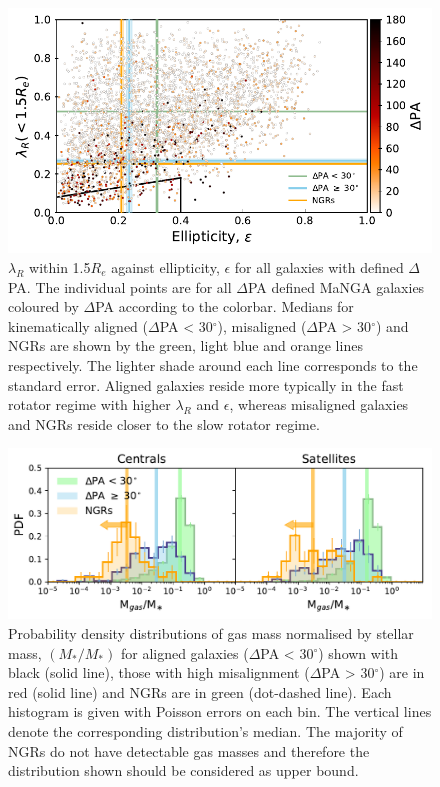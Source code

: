 \documentclass[fleqn,usenatbib]{mnras}
\begin{document}
\begin{figure}
	\includegraphics[width=\linewidth]{total_pop/delPA_lambda_Re.pdf}
    \caption{$\lambda_R$ within 1.5$R_e$ against ellipticity, $\epsilon$ for all galaxies with defined $\Delta$PA. The individual points are for all $\Delta$PA defined MaNGA galaxies coloured by $\Delta$PA according to the colorbar. Medians for kinematically aligned ($\Delta$PA < 30$^{\circ}$), misaligned ($\Delta$PA > 30$^{\circ}$) and NGRs are shown by the green, light blue and orange lines respectively. The lighter shade around each line corresponds to the standard error. Aligned galaxies reside more typically in the fast rotator regime with higher $\lambda_R$ and $\epsilon$, whereas misaligned galaxies and NGRs reside closer to the slow rotator regime.}
    \label{fig:delPA_lambda_Re}
\end{figure}

\begin{figure}
	\includegraphics[width=\linewidth]{total_pop/gas_mass_normed.pdf}
    \caption{Probability density distributions of gas mass normalised by stellar mass, $(M_{\ast}/M_{\ast})$ for aligned galaxies ($\Delta$PA < 30$^{\circ}$) shown with black (solid line), those with high misalignment ($\Delta$PA > 30$^{\circ}$) are in red (solid line) and NGRs are in green (dot-dashed line). Each histogram is given with Poisson errors on each bin. The vertical lines denote the corresponding distribution's median. The majority of NGRs do not have detectable gas masses and therefore the distribution shown should be considered as upper bound.}
    \label{fig:delPA_gasM}
\end{figure}
\end{document}
